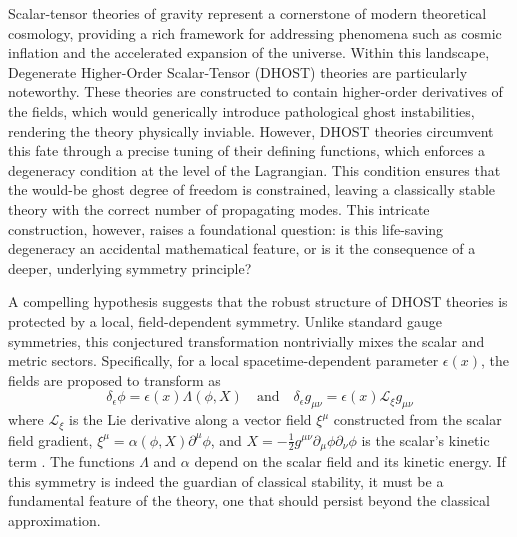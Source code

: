 \documentclass[twocolumn]{aastex631}
\begin{document}
Scalar-tensor theories of gravity represent a cornerstone of modern theoretical cosmology, providing a rich framework for addressing phenomena such as cosmic inflation and the accelerated expansion of the universe. Within this landscape, Degenerate Higher-Order Scalar-Tensor (DHOST) theories are particularly noteworthy. These theories are constructed to contain higher-order derivatives of the fields, which would generically introduce pathological ghost instabilities, rendering the theory physically inviable. However, DHOST theories circumvent this fate through a precise tuning of their defining functions, which enforces a degeneracy condition at the level of the Lagrangian. This condition ensures that the would-be ghost degree of freedom is constrained, leaving a classically stable theory with the correct number of propagating modes. This intricate construction, however, raises a foundational question: is this life-saving degeneracy an accidental mathematical feature, or is it the consequence of a deeper, underlying symmetry principle?

A compelling hypothesis suggests that the robust structure of DHOST theories is protected by a local, field-dependent symmetry. Unlike standard gauge symmetries, this conjectured transformation nontrivially mixes the scalar and metric sectors. Specifically, for a local spacetime-dependent parameter $\epsilon(x)$, the fields are proposed to transform as
\begin{equation}
\delta_\epsilon \phi = \epsilon(x) \Lambda(\phi, X) \quad \text{and} \quad \delta_\epsilon g_{\mu\nu} = \epsilon(x) \mathcal{L}_{\xi} g_{\mu\nu}
\end{equation}
\citep{popławski2024classicalphysicsspacetimefields,kolev2024objectiveratescovariantderivatives}
where $\mathcal{L}_{\xi}$ is the Lie derivative along a vector field $\xi^\mu$ constructed from the scalar field gradient, $\xi^\mu = \alpha(\phi, X)\partial^\mu\phi$, and $X = -\frac{1}{2}g^{\mu\nu}\partial_\mu\phi\partial_\nu\phi$ is the scalar's kinetic term  \citep{gao2019higherderivativescalartensortheory,apostolopoulos2023constructingfamilyconformallyflat}. The functions $\Lambda$ and $\alpha$ depend on the scalar field and its kinetic energy. If this symmetry is indeed the guardian of classical stability, it must be a fundamental feature of the theory, one that should persist beyond the classical approximation.
\end{document}
